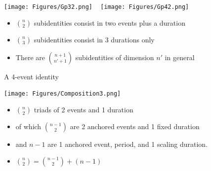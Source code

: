 \documentclass[20pt]{beamer}
\begin{document}

\begin{frame}[plain]
\begin{center}
\Large
\texttt{[image: Figures/Gp32.png]} ~
\texttt{[image: Figures/Gp42.png]} 
\begin{itemize}[<+->]
  \item $\binom{n}{2}$ subidentities consist in two events plus a duration
  \item $\binom{n}{3}$ subidentities consist in 3 durations only
  \item There are $\binom{n+1}{n'+1}$ subidentities of dimension $n'$ in general
\end{itemize}

\end{center}

\end{frame}


\begin{frame}[plain]
\Large

\begin{center}

A 4-event identity
\end{center}

\end{frame}


\begin{frame}[plain]
\Large

\begin{center}
\texttt{[image: Figures/Composition3.png]}
\end{center}
\begin{itemize}[<+->]
  \item $\binom{n}{2}$ triads of 2 events and 1 duration
  \item of which $\binom{n-1}{2}$ are 2 anchored events and 1 fixed duration
  \item and $n-1$ are 1 anchored event, period, and 1 scaling duration.
  \item $\binom{n}{2} = \binom{n-1}{2} + (n-1)$
\end{itemize}
\end{frame}
\end{document}

